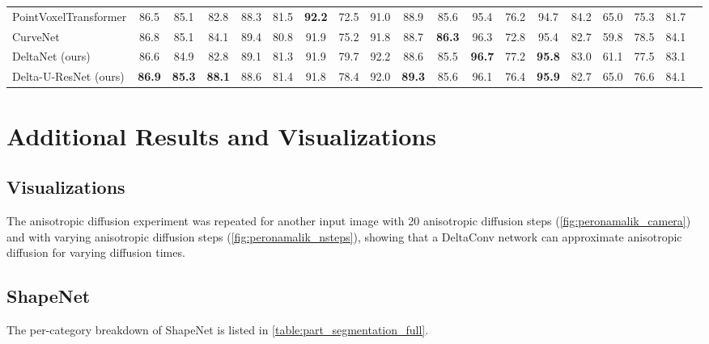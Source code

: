 \documentclass[acmtog, authorversion]{acmart}
\begin{document}
\begin{table*}
\begin{center}
{\begin{tabular}{l|c|ccccccccccccccccr}
                PointVoxelTransformer & 86.5 & 85.1 & 82.8 & 88.3 & 81.5 & \textbf{92.2} & 72.5 & 91.0 & 88.9 & 85.6 & 95.4 & 76.2 & 94.7 & 84.2 & 65.0 & 75.3 & 81.7 \\
                CurveNet & 86.8 & 85.1 & 84.1 & 89.4 & 80.8 & 91.9 & 75.2 & 91.8 & 88.7 & \textbf{86.3} & 96.3 & 72.8 & 95.4 & 82.7 & 59.8 & 78.5 & 84.1 \\
                \midrule
                DeltaNet (ours) &  86.6 &	84.9 &	82.8 &	89.1 &	81.3 &	91.9 &	79.7 &	92.2 &	88.6 &	85.5 &	\textbf{96.7} &	77.2 &	\textbf{95.8} &	83.0 &	61.1 &	77.5 &	83.1            \\
                Delta-U-ResNet (ours) & \textbf{86.9} &	\textbf{85.3} & \textbf{88.1} &	88.6 &	81.4 &	91.8 &	78.4 & 92.0 & \textbf{89.3} & 85.6 & 96.1 & 76.4 & \textbf{95.9} & 82.7 & 65.0 & 76.6 &	84.1 \\
                \bottomrule
                \end{tabular}
        }
    \end{center}
\end{table*}
 
\section{Additional Results and Visualizations}

\subsection{Visualizations}
The anisotropic diffusion experiment was repeated for another input image with 20 anisotropic diffusion steps (\autoref{fig:peronamalik_camera}) and with varying anisotropic diffusion steps (\autoref{fig:peronamalik_nsteps}), showing that a DeltaConv network can approximate anisotropic diffusion for varying diffusion times.

\subsection{ShapeNet}
The per-category breakdown of ShapeNet is listed in \autoref{table:part_segmentation_full}.
\end{document}
